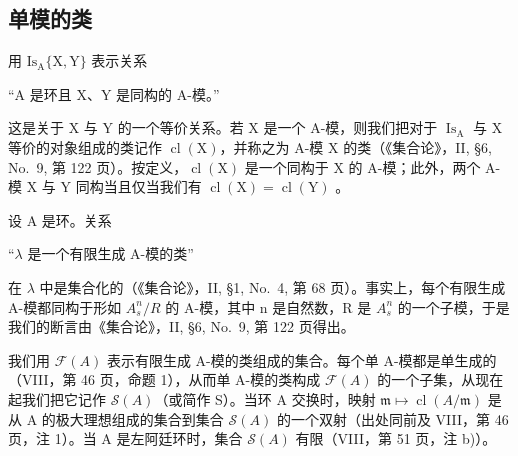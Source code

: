 \subsection{单模的类}

用 \(\mathrm{Is}_{\mathrm{A}}\{\mathrm{X},\mathrm{Y}\}\) 表示关系

``A 是环且 X、Y 是同构的 A-模。''

这是关于 X 与 Y 的一个等价关系。若 X 是一个 A-模，则我们把对于 \(\operatorname{Is}_{\mathrm{A}}\) 与 X 等价的对象组成的类记作 \(\operatorname{cl}(\mathrm{X})\)，并称之为 A-模 X 的类（《集合论》，II, §6, No.~9, 第 122 页）。按定义，\(\operatorname{cl}(\mathrm{X})\) 是一个同构于 X 的 A-模；此外，两个 A-模 X 与 Y 同构当且仅当我们有 \(\operatorname{cl}(\mathrm{X}) = \operatorname{cl}(\mathrm{Y})\) 。

设 A 是环。关系

``\(\lambda\) 是一个有限生成 A-模的类''

在 \(\lambda\) 中是集合化的（《集合论》，II, §1, No.~4, 第 68 页）。事实上，每个有限生成 A-模都同构于形如 \(A_{s}^{n}/R\) 的 A-模，其中 n 是自然数，R 是 \(A_{s}^{n}\) 的一个子模，于是我们的断言由《集合论》，II, §6, No.~9, 第 122 页得出。

我们用 \(\mathcal{F}(A)\) 表示有限生成 A-模的类组成的集合。每个单 A-模都是单生成的（VIII，第 46 页，命题 1），从而单 A-模的类构成 \(\mathcal{F}(A)\) 的一个子集，从现在起我们把它记作 \(\mathcal{S}(A)\)（或简作 S）。当环 A 交换时，映射 \(\mathfrak{m} \mapsto \operatorname{cl}(A/\mathfrak{m})\) 是从 A 的极大理想组成的集合到集合 \(\mathcal{S}(A)\) 的一个双射（出处同前及 VIII，第 46 页，注 1）。当 A 是左阿廷环时，集合 \(\mathcal{S}(A)\) 有限（VIII，第 51 页，注 b)）。

